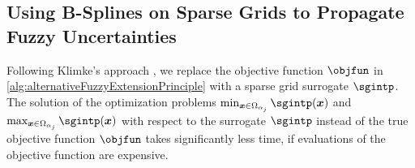 \begin{algorithm}
  \begin{algorithmic}[1]
      \EndFor{}\vspace{-2mm}
    \EndFunction{}
  \end{algorithmic}
  \caption[Alternative fuzzy extension principle]{%
    Alternative fuzzy extension principle.
    Inputs are the number of $\alpha$ segments to use as discretization and
    the $d$ fuzzy intervals $\fuzzy{x}_1, \dotsc, \fuzzy{x}_d$
    (we have to be able to determine $\alpha$-cuts
    of these fuzzy input intervals).
    The output is an approximation to the output $\fuzzy{y}$
    of the alternative fuzzy extension principle
    (given by an approximation of its membership function $\memfun{y}$).%
  }%
  \label{alg:alternativeFuzzyExtensionPrinciple}%
\end{algorithm}



\subsection{Using B-Splines on Sparse Grids to Propagate Fuzzy Uncertainties}
\label{sec:553fuzzyBSplines}

Following Klimke's approach \cite{Klimke06Uncertainty},
we replace the objective function $\objfun$ in
\cref{alg:alternativeFuzzyExtensionPrinciple}
with a sparse grid surrogate $\sgintp$.
The solution of the optimization problems
$\min_{\*x \in \Omega_{\alpha_j}} \sgintp(\*x)$ and
$\max_{\*x \in \Omega_{\alpha_j}} \sgintp(\*x)$ with respect to the
surrogate $\sgintp$ instead of the true objective function $\objfun$
takes significantly less time, if evaluations of the objective function
are expensive.

